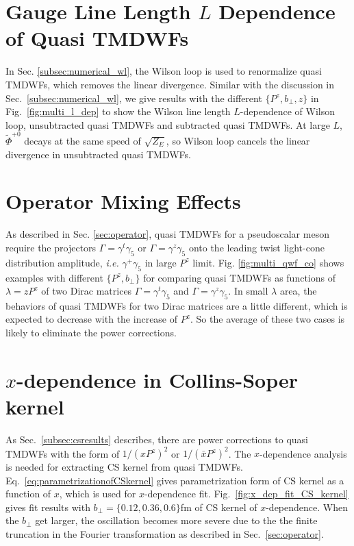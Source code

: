 \documentclass[prd,aps,twocolumn,preprintnumbers, showpacs, nofootinbib,superscriptaddress,notitlepage]{revtex4-1}
\begin{document}
\section{Gauge Line Length $L$ Dependence of Quasi TMDWFs}
\label{sec:gauge_line}

In Sec. \ref{subsec:numerical_wl}, the Wilson loop is used to renormalize quasi TMDWFs, which removes the linear divergence. Similar with the discussion in Sec.~\ref{subsec:numerical_wl}, we give results with the different $\{P^z,b_{\perp},z\}$ in Fig.~\ref{fig:multi_l_dep} to show the Wilson line length $L$-dependence of Wilson loop, unsubtracted quasi TMDWFs and subtracted quasi TMDWFs. At large $L$, $\tilde{\Phi}^{+0}$ decays at the same speed of $\sqrt{Z_E}$, so Wilson loop cancels the linear divergence in unsubtracted quasi TMDWFs.

\section{Operator Mixing Effects}
\label{sec:app_operator_mixing}

As described in Sec. \ref{sec:operator}, quasi TMDWFs for a pseudoscalar meson require  the projectors $\Gamma=\gamma^t\gamma_5$ or $\Gamma=\gamma^z\gamma_5$ onto the leading twist light-cone distribution amplitude, {\it i.e.} $\gamma^+\gamma_5$ in large $P^z$ limit. Fig. \ref{fig:multi_qwf_co} shows examples with different $\{P^z,b_{\perp}\}$ for comparing quasi TMDWFs as functions of $\lambda=zP^z$ of two Dirac matrices $\Gamma=\gamma^t\gamma_5$ and $\Gamma=\gamma^z\gamma_5$. In small $\lambda$ area, the behaviors of quasi TMDWFs for two Dirac matrices are a little different, which is expected to decrease with the increase of $P^z$. So the average of these two cases is likely to eliminate the power corrections. 

\section{$x$-dependence in Collins-Soper kernel}

As Sec.~\ref{subsec:csresults} describes,   there  are power corrections to quasi TMDWFs with the form of $1/(xP^z)^2$ or $1/(\bar{x}P^z)^2$. The $x$-dependence analysis  is needed for extracting CS kernel from quasi TMDWFs. Eq.~\ref{eq:parametrizationofCSkernel} gives parametrization form of CS kernel as a function of $x$, which is used for $x$-dependence fit. Fig.~\ref{fig:x_dep_fit_CS_kernel} gives fit results with $b_{\perp}=\{0.12,0.36,0.6\}$fm of CS kernel of $x$-dependence. When the $b_{\perp}$ get larger, the oscillation becomes more severe  due to the the finite truncation in the Fourier transformation as described in Sec.~\ref{sec:operator}. 
\end{document}
